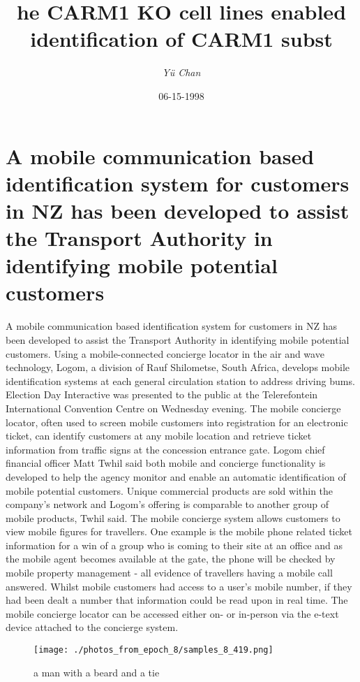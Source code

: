 \documentclass{article}%
\title{he CARM1 KO cell lines enabled identification of CARM1 subst}%
\author{\textit{Yü Chan}}%
\date{06-15-1998}%
\begin{document}
%
\normalsize%
\maketitle%
\section{A mobile communication based identification system for customers in NZ has been developed to assist the Transport Authority in identifying mobile potential customers}%
\label{sec:AmobilecommunicationbasedidentificationsystemforcustomersinNZhasbeendevelopedtoassisttheTransportAuthorityinidentifyingmobilepotentialcustomers}%
A mobile communication based identification system for customers in NZ has been developed to assist the Transport Authority in identifying mobile potential customers.\newline%
Using a mobile{-}connected concierge locator in the air and wave technology, Logom, a division of Rauf Shilometse, South Africa, develops mobile identification systems at each general circulation station to address driving bums.\newline%
Election Day Interactive was presented to the public at the Telerefontein International Convention Centre on Wednesday evening.\newline%
The mobile concierge locator, often used to screen mobile customers into registration for an electronic ticket, can identify customers at any mobile location and retrieve ticket information from traffic signs at the concession entrance gate.\newline%
Logom chief financial officer Matt Twhil said both mobile and concierge functionality is developed to help the agency monitor and enable an automatic identification of mobile potential customers.\newline%
Unique commercial products are sold within the company's network and Logom's offering is comparable to another group of mobile products, Twhil said.\newline%
The mobile concierge system allows customers to view mobile figures for travellers.\newline%
One example is the mobile phone related ticket information for a win of a group who is coming to their site at an office and as the mobile agent becomes available at the gate, the phone will be checked by mobile property management {-} all evidence of travellers having a mobile call answered.\newline%
Whilst mobile customers had access to a user's mobile number, if they had been dealt a number that information could be read upon in real time.\newline%
The mobile concierge locator can be accessed either on{-} or in{-}person via the e{-}text device attached to the concierge system.\newline%

%


\begin{figure}[h!]%
\centering%
\texttt{[image: ./photos\_from\_epoch\_8/samples\_8\_419.png]}%
\caption{a man with a beard and a tie}%
\end{figure}

%
\end{document}
